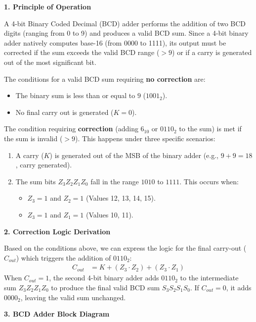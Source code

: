 \documentclass[12pt,a3paper]{article}
\begin{document}
\begin{enumerate}
\begin{tcolorbox}[enhanced,breakable,ansbox,colback=cD!4,colframe=cD,boxrule=0.8pt,arc=5pt,title={\textbf{Answer}},fonttitle=\bfseries\color{white},colbacktitle=cD]
\textbf{\textcolor{cD}{1. Principle of Operation}}

A 4-bit Binary Coded Decimal (BCD) adder performs the addition of two BCD digits (ranging from 0 to 9) and produces a valid BCD sum. Since a 4-bit binary adder natively computes base-16 (from 0000 to 1111), its output must be corrected if the sum exceeds the valid BCD range ($>9$) or if a carry is generated out of the most significant bit.

The conditions for a valid BCD sum requiring \textbf{no correction} are:
\begin{itemize}
    \item The binary sum is less than or equal to $9$ ($1001_2$).
    \item No final carry out is generated ($K=0$).
\end{itemize}

The condition requiring \textbf{correction} (adding $6_{10}$ or $0110_2$ to the sum) is met if the sum is invalid ($>9$). This happens under three specific scenarios:
\begin{enumerate}
    \item A carry ($K$) is generated out of the MSB of the binary adder (e.g., $9+9=18$, carry generated).
    \item The sum bits $Z_3 Z_2 Z_1 Z_0$ fall in the range $1010$ to $1111$. This occurs when:
    \begin{itemize}
        \item $Z_3 = 1$ and $Z_2 = 1$ (Values 12, 13, 14, 15).
        \item $Z_3 = 1$ and $Z_1 = 1$ (Values 10, 11).
    \end{itemize}
\end{enumerate}

\vspace{1em}
\textbf{\textcolor{cD}{2. Correction Logic Derivation}}

Based on the conditions above, we can express the logic for the final carry-out ($C_{out}$) which triggers the addition of $0110_2$:
\begin{align*}
    C_{out} &= K + (Z_3 \cdot Z_2) + (Z_3 \cdot Z_1)
\end{align*}
When $C_{out} = 1$, the second 4-bit binary adder adds $0110_2$ to the intermediate sum $Z_3 Z_2 Z_1 Z_0$ to produce the final valid BCD sum $S_3 S_2 S_1 S_0$. If $C_{out} = 0$, it adds $0000_2$, leaving the valid sum unchanged.

\vspace{1em}
\textbf{\textcolor{cD}{3. BCD Adder Block Diagram}}


\end{tcolorbox}
\end{enumerate}
\end{document}
